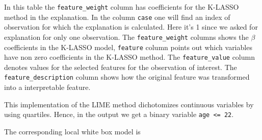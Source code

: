 \documentclass[]{krantz}
\newenvironment{Shaded}{\begin{snugshade}}{\end{snugshade}}
\newcommand{\CommentTok}[1]{\textcolor[rgb]{0.56,0.35,0.01}{\textit{#1}}}
\newcommand{\DataTypeTok}[1]{\textcolor[rgb]{0.13,0.29,0.53}{#1}}
\newcommand{\DecValTok}[1]{\textcolor[rgb]{0.00,0.00,0.81}{#1}}
\newcommand{\KeywordTok}[1]{\textcolor[rgb]{0.13,0.29,0.53}{\textbf{#1}}}
\newcommand{\NormalTok}[1]{#1}
\newcommand{\OperatorTok}[1]{\textcolor[rgb]{0.81,0.36,0.00}{\textbf{#1}}}
\newcommand{\StringTok}[1]{\textcolor[rgb]{0.31,0.60,0.02}{#1}}
\begin{document}
\begin{Shaded}
\end{Shaded}

In this table the \texttt{feature\_weight} column has coefficients for the K-LASSO method in the explanation. In the column \texttt{case} one will find an index of observation for which the explanation is calculated. Here it's 1 since we asked for explanation for only one observation.
The \texttt{feature\_weight} columns shows the \(\beta\) coefficients in the K-LASSO model, \texttt{feature} column points out which variables have non zero coefficients in the K-LASSO method. The \texttt{feature\_value} column denotes values for the selected features for the observation of interest. The \texttt{feature\_description} column shows how the original feature was transformed into a interpretable feature.

This implementation of the LIME method dichotomizes continuous variables by using quartiles. Hence, in the output we get a binary variable \texttt{age\ \textless{}=\ 22}.

The corresponding local white box model is
\end{document}
